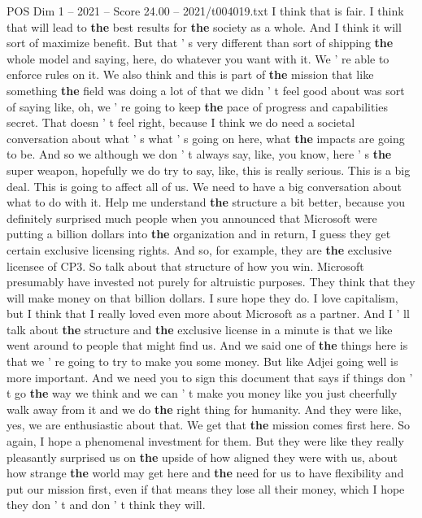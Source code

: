 \begin{textsample}{POS Dim 1 – 2021 – Score 24.00 – 2021/t004019.txt}
I think that is fair.
I think that will lead to \textbf{the} best results for \textbf{the} society as a whole.
And I think it will sort of maximize benefit.
But that ' s very different than sort of shipping \textbf{the} whole model and saying, here, do whatever you want with it.
We ' re able to enforce rules on it.
We also think and this is part of \textbf{the} mission that like something \textbf{the} field was doing a lot of that we didn ' t feel good about was sort of saying like, oh, we ' re going to keep \textbf{the} pace of progress and capabilities secret.
That doesn ' t feel right, because I think we do need a societal conversation about what ' s what ' s going on here, what \textbf{the} impacts are going to be.
And so we although we don ' t always say, like, you know, here ' s \textbf{the} super weapon, hopefully we do try to say, like, this is really serious.
This is a big deal.
This is going to affect all of us.
We need to have a big conversation about what to do with it.
Help me understand \textbf{the} structure a bit better, because you definitely surprised much people when you announced that Microsoft were putting a billion dollars into \textbf{the} organization and in return, I guess they get certain exclusive licensing rights.
And so, for example, they are \textbf{the} exclusive licensee of CP3.
So talk about that structure of how you win.
Microsoft presumably have invested not purely for altruistic purposes.
They think that they will make money on that billion dollars.
I sure hope they do.
I love capitalism, but I think that I really loved even more about Microsoft as a partner.
And I ' ll talk about \textbf{the} structure and \textbf{the} exclusive license in a minute is that we like went around to people that might find us.
And we said one of \textbf{the} things here is that we ' re going to try to make you some money.
But like Adjei going well is more important.
And we need you to sign this document that says if things don ' t go \textbf{the} way we think and we can ' t make you money like you just cheerfully walk away from it and we do \textbf{the} right thing for humanity.
And they were like, yes, we are enthusiastic about that.
We get that \textbf{the} mission comes first here.
So again, I hope a phenomenal investment for them.
But they were like they really pleasantly surprised us on \textbf{the} upside of how aligned they were with us, about how strange \textbf{the} world may get here and \textbf{the} need for us to have flexibility and put our mission first, even if that means they lose all their money, which I hope they don ' t and don ' t think they will.

\end{textsample}
